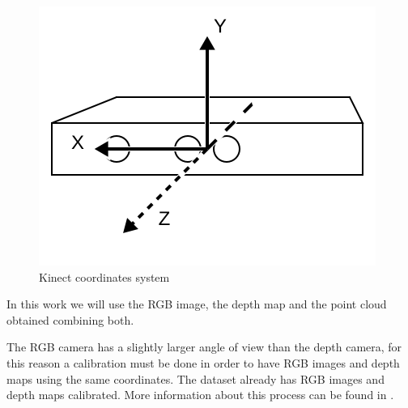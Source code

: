 \begin{figure}[H]
\begin{center}
\includegraphics[scale=0.55]{images/coordinates}
\caption{Kinect coordinates system}
\label{fig:coordinates}
\end{center}
\end{figure}

In this work we will use the RGB image, the depth map and the point cloud obtained combining both.
 
The RGB camera has a slightly larger angle of view than the depth camera, for this reason a calibration must be done 
in order to have RGB images and depth maps using the same coordinates. The dataset already has RGB images and depth maps 
calibrated. More information about 
this process can be found in \cite{sturm12iros}.
